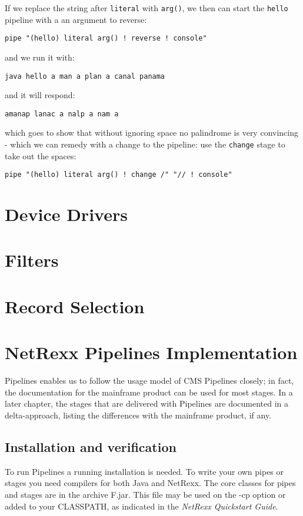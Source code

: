 If we replace the string after \texttt{literal} with \texttt{arg()},
we then can start the \texttt{hello} pipeline with a an argument to
reverse:
\begin{shaded}
\begin{verbatim}
pipe "(hello) literal arg() ! reverse ! console"
\end{verbatim}
\end{shaded}
 and we run it with:
\begin{verbatim}
java hello a man a plan a canal panama
\end{verbatim}
and it will respond:
\begin{verbatim}
amanap lanac a nalp a nam a
\end{verbatim}
which goes to show that without ignoring space no palindrome is very
convincing - which we can remedy with a change to the pipeline: use the
\texttt{change} stage to take out the spaces:
\begin{shaded}
\begin{verbatim}
pipe "(hello) literal arg() ! change /" "// ! console"
\end{verbatim}
\end{shaded}

\chapter{Device Drivers}
\chapter{Filters}
\chapter{Record Selection}


\chapter{NetRexx Pipelines Implementation}
\nr{} Pipelines enables us to follow the usage model of CMS Pipelines
closely; in fact, the documentation for the mainframe product can be
used for most stages. In a later chapter, the stages that are
delivered with \nr{} Pipelines are documented in a delta-approach, listing the differences with the mainframe product, if any.

\section{Installation and verification}
To run \nr{} Pipelines a running \nr{} installation is needed.  To write your own pipes or stages you need compilers for both Java and NetRexx. 
The core classes for pipes and stages are in the archive \nr{}F.jar.  This file may
be used on the -cp option or added to your CLASSPATH, as indicated in
the \emph{NetRexx Quickstart Guide}.

